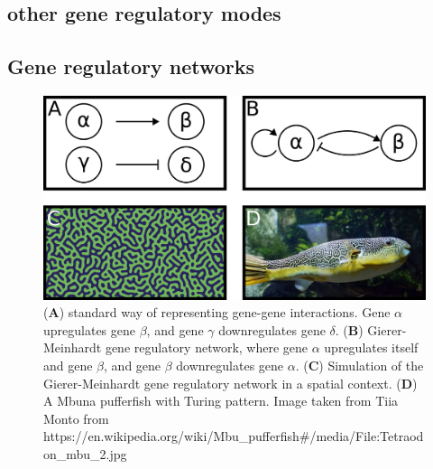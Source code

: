 \subsection{other gene regulatory modes}

\subsection{Gene regulatory networks}



\begin{figure}[H]
    \includegraphics[width=\linewidth]{ch1.Introduction/imgs/network.png}
    \caption{(\textbf{A}) standard way of representing gene-gene interactions. Gene $\alpha$ upregulates gene $\beta$, and gene $\gamma$ downregulates gene $\delta$. (\textbf{B}) Gierer-Meinhardt gene regulatory network, where gene $\alpha$ upregulates itself and gene $\beta$, and gene $\beta$ downregulates gene $\alpha$. (\textbf{C}) Simulation of the Gierer-Meinhardt gene regulatory network in a spatial context. (\textbf{D}) A Mbuna pufferfish with Turing pattern. Image taken from Tiia Monto from https://en.wikipedia.org/wiki/Mbu\_pufferfish\#/media/File:Tetraodon\_mbu\_2.jpg}
    \label{fig:network}
\end{figure}

